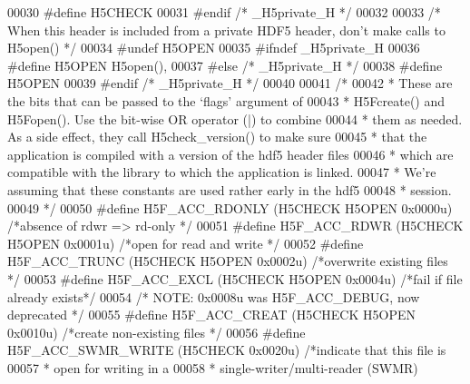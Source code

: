 \begin{DoxyCode}
00030 \textcolor{preprocessor}{#define H5CHECK}
00031 \textcolor{preprocessor}{#endif  }\textcolor{comment}{/* \_H5private\_H */}\textcolor{preprocessor}{}
00032 
00033 \textcolor{comment}{/* When this header is included from a private HDF5 header, don't make calls to H5open() */}
00034 \textcolor{preprocessor}{#undef H5OPEN}
00035 \textcolor{preprocessor}{#ifndef \_H5private\_H}
00036 \textcolor{preprocessor}{#define H5OPEN        H5open(),}
00037 \textcolor{preprocessor}{#else   }\textcolor{comment}{/* \_H5private\_H */}\textcolor{preprocessor}{}
00038 \textcolor{preprocessor}{#define H5OPEN}
00039 \textcolor{preprocessor}{#endif  }\textcolor{comment}{/* \_H5private\_H */}\textcolor{preprocessor}{}
00040 
00041 \textcolor{comment}{/*}
00042 \textcolor{comment}{ * These are the bits that can be passed to the `flags' argument of}
00043 \textcolor{comment}{ * H5Fcreate() and H5Fopen(). Use the bit-wise OR operator (|) to combine}
00044 \textcolor{comment}{ * them as needed.  As a side effect, they call H5check\_version() to make sure}
00045 \textcolor{comment}{ * that the application is compiled with a version of the hdf5 header files}
00046 \textcolor{comment}{ * which are compatible with the library to which the application is linked.}
00047 \textcolor{comment}{ * We're assuming that these constants are used rather early in the hdf5}
00048 \textcolor{comment}{ * session.}
00049 \textcolor{comment}{ */}
00050 \textcolor{preprocessor}{#define H5F\_ACC\_RDONLY  (H5CHECK H5OPEN 0x0000u)    }\textcolor{comment}{/*absence of rdwr => rd-only */}\textcolor{preprocessor}{}
00051 \textcolor{preprocessor}{#define H5F\_ACC\_RDWR    (H5CHECK H5OPEN 0x0001u)    }\textcolor{comment}{/*open for read and write    */}\textcolor{preprocessor}{}
00052 \textcolor{preprocessor}{#define H5F\_ACC\_TRUNC   (H5CHECK H5OPEN 0x0002u)    }\textcolor{comment}{/*overwrite existing files   */}\textcolor{preprocessor}{}
00053 \textcolor{preprocessor}{#define H5F\_ACC\_EXCL    (H5CHECK H5OPEN 0x0004u)    }\textcolor{comment}{/*fail if file already exists*/}\textcolor{preprocessor}{}
00054 \textcolor{comment}{/* NOTE: 0x0008u was H5F\_ACC\_DEBUG, now deprecated */}
00055 \textcolor{preprocessor}{#define H5F\_ACC\_CREAT   (H5CHECK H5OPEN 0x0010u)    }\textcolor{comment}{/*create non-existing files  */}\textcolor{preprocessor}{}
00056 \textcolor{preprocessor}{#define H5F\_ACC\_SWMR\_WRITE  (H5CHECK 0x0020u) }\textcolor{comment}{/*indicate that this file is}
00057 \textcolor{comment}{                                                 * open for writing in a}
00058 \textcolor{comment}{                                                 * single-writer/multi-reader (SWMR)}

\end{DoxyCode}
